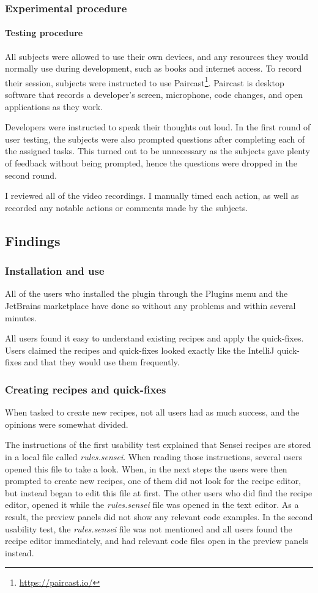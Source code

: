 \subsubsection{Experimental procedure}
\paragraph{Testing procedure}
All subjects were allowed to use their own devices, and any resources they would normally use during development, such as books and internet access. To record their session, subjects were instructed to use Paircast\footnote{\url{https://paircast.io/}}.
Paircast is desktop software that records a developer's screen, microphone, code changes, and open applications as they work.

Developers were instructed to speak their thoughts out loud.
In the first round of user testing, the subjects were also prompted questions after completing each of the assigned tasks.
This turned out to be unnecessary as the subjects gave plenty of feedback without being prompted, hence the questions were dropped in the second round.

I reviewed all of the video recordings.
I manually timed each action, as well as recorded any notable actions or comments made by the subjects.

\subsection{Findings}
\subsubsection{Installation and use}
All of the users who installed the plugin through the Plugins menu and the JetBrains marketplace have done so without any problems and within several minutes.

All users found it easy to understand existing recipes and apply the quick-fixes.
Users claimed the recipes and quick-fixes looked exactly like the IntelliJ quick-fixes and that they would use them frequently.

\subsubsection{Creating recipes and quick-fixes}
When tasked to create new recipes, not all users had as much success, and the opinions were somewhat divided.

The instructions of the first usability test explained that Sensei recipes are stored in a local file called \textit{rules.sensei}.
When reading those instructions, several users opened this file to take a look.
When, in the next steps the users were then prompted to create new recipes, one of them did not look for the recipe editor, but instead began to edit this file at first.
The other users who did find the recipe editor, opened it while the \textit{rules.sensei} file was opened in the text editor.
As a result, the preview panels did not show any relevant code examples.
In the second usability test, the \textit{rules.sensei} file was not mentioned and all users found the recipe editor immediately, and had relevant code files open in the preview panels instead.

